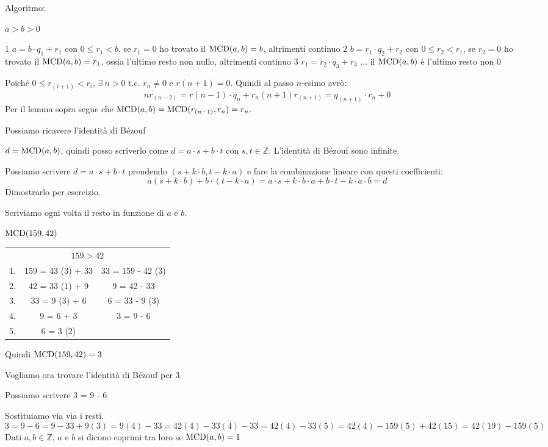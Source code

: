Algoritmo:

$a > b > 0$

1 $a = b \cdot q_1 + r_1$  con $0 \le r_1 < b$, se $r_1 = 0$ ho trovato il $\operatorname{MCD}(a,b) = b$, altrimenti continuo
2 $b = r_1 \cdot q_2 + r_2$  con $0 \le r_2 < r_1$, se $r_2 = 0$ ho trovato il $\operatorname{MCD}(a,b) = r_1$, ossia l'ultimo resto non nullo, altrimenti continuo
3 $r_1 = r_2 \cdot q_3 + r_3$ ... il $\operatorname{MCD}(a,b)$ \`e l'ultimo resto non 0

Poich\'e $0 \le r_{(i+1)} < r_i$, $\exists \ n > 0$ t.c. $r_{n} \neq 0$ e $r{(n+1)} = 0$. Quindi al passo $n$-esimo avr\`o:
\[
n r_{(n-2)} = r{(n-1)} \cdot q_n + r_n
(n+1) r_{(n+1)} = q_{(n+1)} \cdot r_n + 0
\]
Per il lemma sopra segue che $\operatorname{MCD}(a,b) = \operatorname{MCD}(r_{(n-1)}, r_{n}) = r_{n}$.

Possiamo ricavere l'identit\`a di B\'ezouf

$d = \operatorname{MCD}(a,b)$, quindi posso scriverlo come $d = a \cdot s + b \cdot t$ con $s, t \in \mathbb{Z}$. L'identit\`a di B\'ezouf sono infinite.

Possiamo scrivere $d = a \cdot s + b \cdot t$ prendendo $(s + k \cdot b, t - k \cdot a)$ e fare la combinazione lineare con questi coefficienti:
\[
a (s + k \cdot b) + b \cdot (t - k \cdot a) = a \cdot s + k \cdot b \cdot a + b \cdot t - k \cdot a \cdot b = d
\]
Dimostrarlo per esercizio.

Scriviamo ogni volta il resto in funzione di $a$ e $b$.

$\operatorname{MCD}(159, 42)$

\begin{tabular}{*{3}{c}}
\multicolumn{3}{c}{$159 > 42$} \\
1. & 159 = 43 (3) + 33     & 33 = 159 - 42 (3) \\
2. & 42 = 33 (1) + 9       & 9 = 42 - 33 \\
3. & 33 = 9 (3) + 6        & 6 = 33 - 9 (3) \\
4. & 9 = 6 + 3             & 3 = 9 - 6 \\
5. & 6 = 3 (2) &
\end{tabular}

Quindi $\operatorname{MCD}(159, 42) = 3$

Vogliamo ora trovare l'identit\`a di B\'ezouf per 3.

Possiamo scrivere 3 = 9 - 6

Sostituiamo via via i resti.
\[
3 = 9 - 6 = 9 - 33 + 9 (3) = 9 (4) - 33 = 42 (4) - 33 (4) - 33 = 42 (4) - 33 (5) = 42 (4) - 159 (5) + 42 (15) = 42 (19) - 159 (5)
\]
Dati $a, b \in \mathbb{Z}$, $a$ e $b$ si dicono coprimi tra loro se $\operatorname{MCD}(a,b) = 1$

